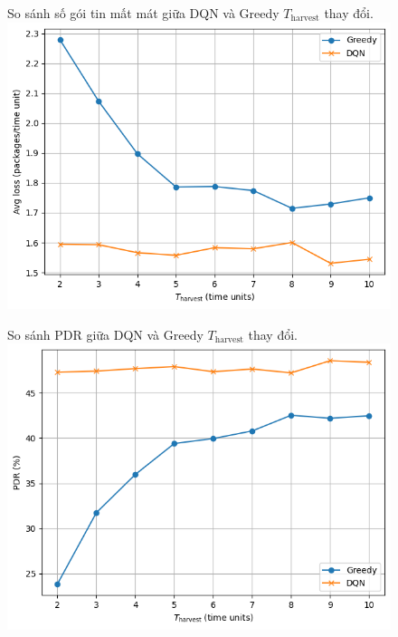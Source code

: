 \documentclass{uetgraduation}
\begin{document}
\begin{enumerate}
\begin{figure}{So sánh số gói tin mất mát giữa DQN và Greedy $T_\text{harvest}$ thay đổi.}
        \includegraphics[scale=0.5]{t_harvest_loss.png}
        \label{fig:t_loss}
    \end{figure}
    \begin{figure}{So sánh PDR giữa DQN và Greedy $T_\text{harvest}$ thay đổi.}
        \centering
        \includegraphics[scale=0.5]{t_harvest_pdr.png}
        \label{fig:t_pdr}
    \end{figure}

\end{enumerate}
\end{document}
